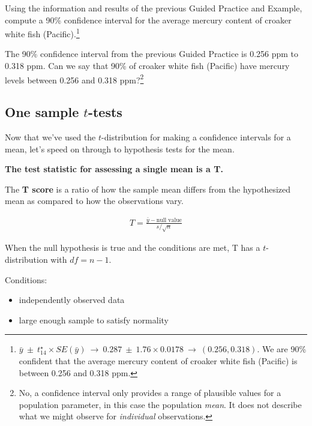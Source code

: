 \documentclass[
  10pt,
  openany]{book}
\providecommand{\tightlist}{%
  \setlength{\itemsep}{0pt}\setlength{\parskip}{0pt}}
\theoremstyle{definition}
\theoremstyle{definition}
\theoremstyle{definition}
\theoremstyle{definition}
\theoremstyle{remark}
\begin{document}
Using the information and results of the previous Guided Practice and Example, compute a 90\% confidence interval for the average mercury content of croaker white fish (Pacific).\footnote{\(\bar{y} \ \pm\ t^{\star}_{14} \times SE(\bar{y})
        \ \to\  0.287 \ \pm\  1.76 \times 0.0178
        \ \to\ (0.256, 0.318)\).
  We are 90\% confident that the average mercury content
  of croaker white fish (Pacific) is between 0.256 and 0.318 ppm.}

The 90\% confidence interval from the previous
Guided Practice is 0.256 ppm to 0.318 ppm.
Can we say that 90\% of croaker white fish (Pacific)
have mercury levels between 0.256 and 0.318 ppm?\footnote{No, a confidence interval only provides a range
  of plausible values for a population parameter,
  in this case the population \emph{mean}.
  It does not describe what we might observe
  for \emph{individual} observations.}


\subsection{\texorpdfstring{One sample \(t\)-tests}{One sample t-tests}}\label{one-sample-t-tests}

Now that we've used the \(t\)-distribution for making a confidence
intervals for a mean, let's speed on through to
hypothesis tests for the mean.

\textbf{The test statistic for assessing a single mean is a T.}

The \textbf{T score} is a ratio of how the sample mean differs from the hypothesized mean as compared to how the observations vary.

\begin{align*}
T = \frac{\bar{y} - \mbox{null value}}{s/\sqrt{n}}
\end{align*}

When the null hypothesis is true and the conditions are met, T has a \(t\)-distribution with \(df = n - 1\).

Conditions:

\begin{itemize}
\tightlist
\item
  independently observed data\\
\item
  large enough sample to satisfy normality\\
\end{itemize}
\end{document}
